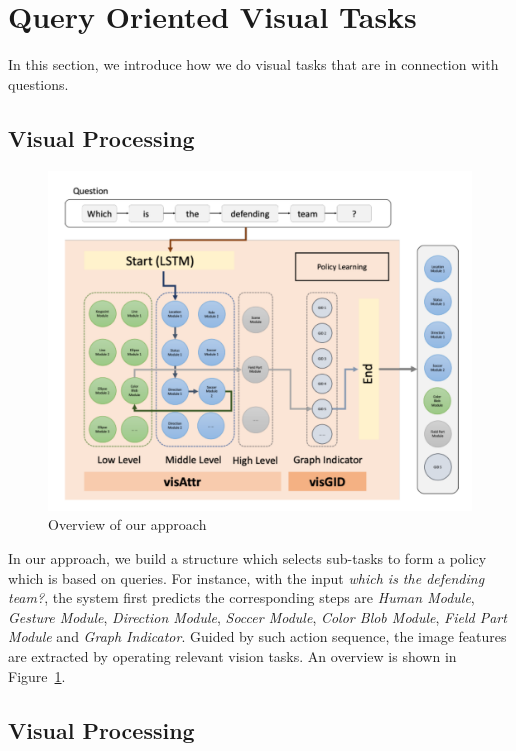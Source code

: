 \section{Query Oriented Visual Tasks}
\label{sec-reinforcement-learning}
In this section, we introduce how we do visual tasks that are in connection with questions. 


\subsection{Visual Processing}
\label{sec-visual-processing}
\begin{figure}[h]
\begin{center}
\includegraphics[width=\linewidth]{figure/RLplot.png}
\end{center}
\caption{Overview of our approach}
\label{fig:RLplot}
\end{figure}

In our approach, we build a structure which selects sub-tasks to form a policy which is based on queries. For instance, with the input \textit{which is the defending team?}, the system first predicts the corresponding steps are \textit{Human Module}, \textit{Gesture Module}, \textit{Direction Module}, \textit{Soccer Module}, \textit{Color Blob Module}, \textit{Field Part Module} and \textit{Graph Indicator}. Guided by such action sequence, the image features are extracted by operating relevant vision tasks. An overview is shown in Figure~\ref{fig:RLplot}.

\subsection{Visual Processing}
\label{sec-visual-processing}

